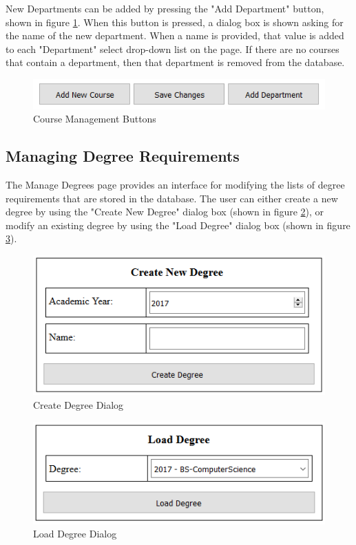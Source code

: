 \documentclass[]{article}
\begin{document}
		New Departments can be added by pressing the "Add Department" button, shown in figure \ref{addepartment}. When this button is pressed, a dialog box is shown asking for the name of the new department. When a name is provided, that value is added to each "Department" select drop-down list on the page. If there are no courses that contain a department, then that department is removed from the database. 
		\begin{figure}[H]
			\caption{Course Management Buttons}
			\label{addepartment}
			\centering
			\includegraphics{savecourses.PNG}
		\end{figure}
	\subsection{Managing Degree Requirements}\label{ssec:13}
		The Manage Degrees page provides an interface for modifying the lists of degree requirements that are stored in the database. The user can either create a new degree by using the "Create New Degree" dialog box (shown in figure \ref{createdegree}), or modify an existing degree by using the "Load Degree" dialog box (shown in figure \ref{loaddegree}).
		\begin{figure}[H]
			\caption{Create Degree Dialog}
			\label{createdegree}
			\centering
			\includegraphics{createdegree.PNG}
		\end{figure}
		\begin{figure}[H]
			\caption{Load Degree Dialog}
			\label{loaddegree}
			\centering
			\includegraphics{loaddegree.PNG}
		\end{figure}
\end{document}
